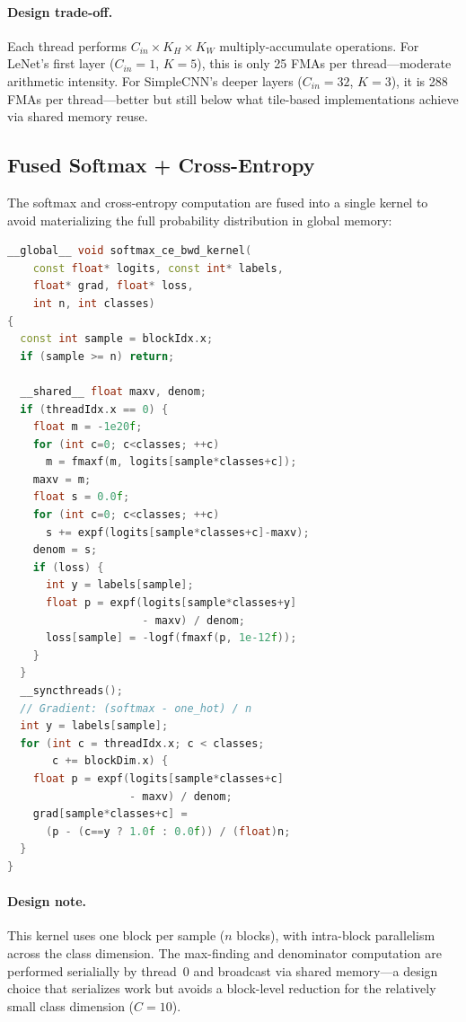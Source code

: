 \documentclass[10pt,twocolumn,letterpaper]{article}
\begin{document}
\paragraph{Design trade-off.}
Each thread performs $C_{in} \times K_H \times K_W$ multiply-accumulate operations.
For LeNet's first layer ($C_{in}=1$, $K=5$), this is only 25 FMAs per thread---moderate arithmetic intensity.
For SimpleCNN's deeper layers ($C_{in}=32$, $K=3$), it is 288 FMAs per thread---better but still below what tile-based implementations achieve via shared memory reuse.

\subsection{Fused Softmax + Cross-Entropy}

The softmax and cross-entropy computation are fused into a single kernel to avoid materializing the full probability distribution in global memory:

\begin{lstlisting}[language=C++, caption={Fused softmax cross-entropy backward kernel.}, label={lst:softmax}]
__global__ void softmax_ce_bwd_kernel(
    const float* logits, const int* labels,
    float* grad, float* loss,
    int n, int classes)
{
  const int sample = blockIdx.x;
  if (sample >= n) return;

  __shared__ float maxv, denom;
  if (threadIdx.x == 0) {
    float m = -1e20f;
    for (int c=0; c<classes; ++c)
      m = fmaxf(m, logits[sample*classes+c]);
    maxv = m;
    float s = 0.0f;
    for (int c=0; c<classes; ++c)
      s += expf(logits[sample*classes+c]-maxv);
    denom = s;
    if (loss) {
      int y = labels[sample];
      float p = expf(logits[sample*classes+y]
                     - maxv) / denom;
      loss[sample] = -logf(fmaxf(p, 1e-12f));
    }
  }
  __syncthreads();
  // Gradient: (softmax - one_hot) / n
  int y = labels[sample];
  for (int c = threadIdx.x; c < classes;
       c += blockDim.x) {
    float p = expf(logits[sample*classes+c]
                   - maxv) / denom;
    grad[sample*classes+c] =
      (p - (c==y ? 1.0f : 0.0f)) / (float)n;
  }
}
\end{lstlisting}

\paragraph{Design note.}
This kernel uses one block per sample ($n$ blocks), with intra-block parallelism across the class dimension.
The max-finding and denominator computation are performed serialially by thread~0 and broadcast via shared memory---a design choice that serializes work but avoids a block-level reduction for the relatively small class dimension ($C=10$).
\end{document}
